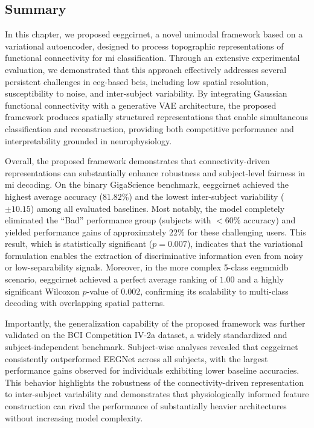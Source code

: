 {{%
\subsection{Summary}\label{sec:Conclusions1}
In this chapter, we proposed \gls{eeggcirnet}, a novel unimodal framework based on a variational autoencoder, designed to process topographic representations of functional connectivity for \gls{mi} classification. Through an extensive experimental evaluation, we demonstrated that this approach effectively addresses several persistent challenges in \gls{eeg}-based \glspl{bci}, including low spatial resolution, susceptibility to noise, and inter-subject variability. By integrating Gaussian functional connectivity with a generative VAE architecture, the proposed framework produces spatially structured representations that enable simultaneous classification and reconstruction, providing both competitive performance and interpretability grounded in neurophysiology.

{Overall, the proposed framework demonstrates that} connectivity-driven representations can substantially enhance robustness and subject-level fairness in \gls{mi} decoding. On the binary GigaScience benchmark, \gls{eeggcirnet} achieved the highest average accuracy ($81.82\%$) and the lowest inter-subject variability ($\pm10.15$) among all evaluated baselines. Most notably, the model completely eliminated the ``Bad'' performance group (subjects with $<60\%$ accuracy) and yielded performance gains of approximately $22\%$ for these challenging users. This result, which is statistically significant ($p=0.007$), indicates that the variational formulation enables the extraction of discriminative information even from noisy or low-separability signals. Moreover, in the more complex 5-class \gls{eegmmidb} scenario, \gls{eeggcirnet} achieved a perfect average ranking of ${1.00}$ and a highly significant Wilcoxon $p$-value of ${0.002}$, confirming its scalability to multi-class decoding with overlapping spatial patterns.

Importantly, the generalization capability of the proposed framework was further validated on the BCI Competition IV-2a dataset, a widely standardized and subject-independent benchmark. Subject-wise analyses revealed that \gls{eeggcirnet} consistently outperformed EEGNet across all subjects, with the largest performance gains observed for individuals exhibiting lower baseline accuracies. This behavior highlights the robustness of the connectivity-driven representation to inter-subject variability and demonstrates that physiologically informed feature construction can rival the performance of substantially heavier architectures without increasing model complexity.

}}
